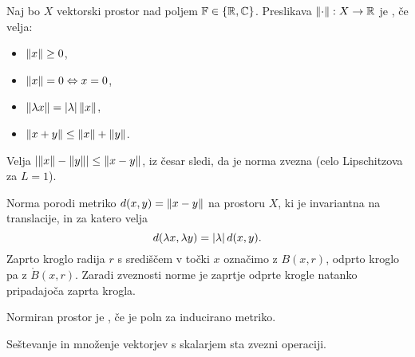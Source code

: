
\begin{definicija}
  Naj bo $X$ vektorski prostor nad poljem $\mathbb{F} \in \{\mathbb{R}, \mathbb{C}\}$.
  Preslikava $\left\lVert\cdot\right\rVert: X \to \mathbb{R}$ je , če velja:
  \begin{itemize}
  \item $\left\lVert x\right\rVert \ge 0$,
  \item $\left\lVert x\right\rVert = 0 \Leftrightarrow x = 0$,
  \item $\left\lVert\lambda x\right\rVert = \left| \lambda \right| \left\lVert x\right\rVert$,
  \item $\left\lVert x + y\right\rVert \le \left\lVert x\right\rVert + \left\lVert y\right\rVert$.
  \end{itemize}
\end{definicija}

\begin{opomba}
  Velja $\left| \left\lVert x\right\rVert - \left\lVert y\right\rVert \right| \le \left\lVert x - y\right\rVert$, iz česar sledi, da je
  norma zvezna (celo Lipschitzova za $L = 1$).
\end{opomba}

Norma porodi metriko $d(x,y) = \left\lVert x-y\right\rVert$ na prostoru $X$, ki je invariantna na
translacije, in za katero velja
\[
  d(\lambda x, \lambda y) = \left| \lambda \right| d(x,y).
\]
Zaprto kroglo radija $r$ s središčem v točki $x$ označimo z $B(x, r)$, odprto
kroglo pa z $\mathring{B}(x, r)$.
Zaradi zveznosti norme je zaprtje odprte krogle natanko pripadajoča zaprta
krogla.

\begin{definicija}
  Normiran prostor je , če je poln za inducirano metriko.
\end{definicija}

\begin{trditev}
  Seštevanje in množenje vektorjev s skalarjem sta zvezni operaciji.
\end{trditev}

